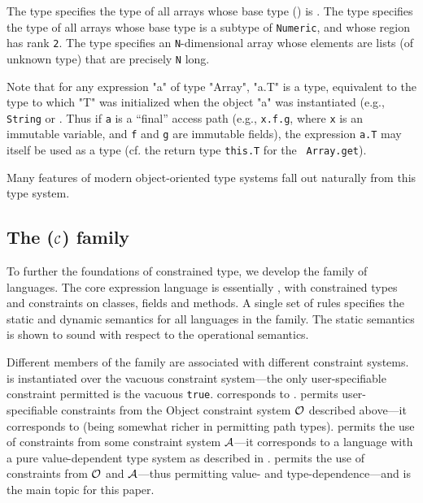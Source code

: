 The type  specifies the type of all arrays
whose base type () is . The type
 \Xcd{<:}   specifies the type of all arrays whose base
type is a subtype of {\tt Numeric}, and whose region has rank {\tt 2}.
The type 
specifies an {\tt N}-dimensional array whose elements are lists (of
unknown type) that are precisely {\tt N} long.

Note that for any expression \xcd"a" of type \xcd"Array", \xcd"a.T" is
a type, equivalent to the type to which \xcd"T" was initialized when
the object \xcd"a" was instantiated (e.g., {\tt String} or
.  Thus if {\tt a} is a ``final'' access path
(e.g., {\tt x.f.g}, where {\tt x} is an immutable variable, and {\tt f}
and {\tt g} are immutable fields), the expression {\tt a.T} may itself
be used as a type (cf. the return type {\tt this.T} for the {\tt
Array.get}).

Many features of modern object-oriented type systems fall out
naturally from this type system.

\subsection{The \FX($\cal C$) family}
To further the foundations of constrained type, we develop the \FX{}
family of languages. The core expression language is essentially
\FJ \cite{FJ}, with constrained types and constraints on classes, fields
and methods. A single set of rules specifies the static and dynamic
semantics for all languages in the family.  The static semantics is
shown to sound with respect to the operational semantics.

Different members of the family are associated with different
constraint systems. \FXZ{} is
\FX{} instantiated over the vacuous constraint system---the only
user-specifiable constraint permitted is the vacuous {\tt true}. \FXZ{}
corresponds to \FJ. \FXG{} permits user-specifiable constraints from the 
Object constraint system $\cal O$ described above---it corresponds to
\FGJ{} (being somewhat richer in permitting path types). \FXD{} permits
the use of constraints from some constraint system $\cal A$---it
corresponds to a language with a pure value-dependent type system as
described in \cite{OOPSLA08}. \FXGD{} permits the use of constraints
from $\cal O$ and $\cal A$---thus permitting value- and
type-dependence---and is the main topic for this paper.

